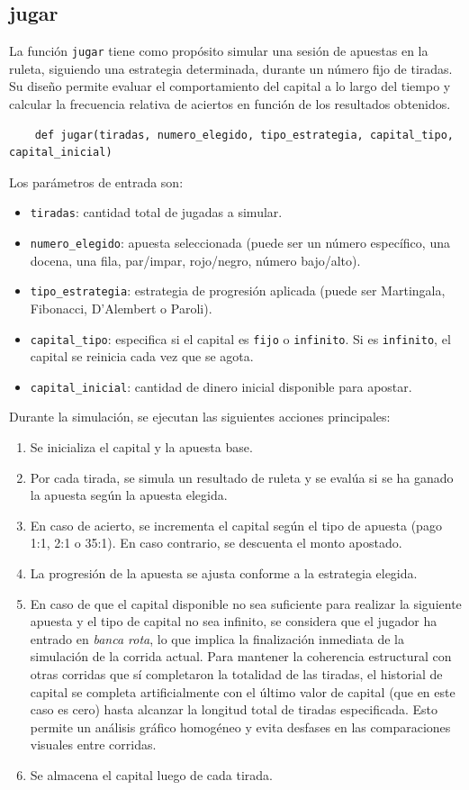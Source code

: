 \documentclass{article}
\begin{document}
\subsection{jugar}
La función \texttt{jugar} tiene como propósito simular una sesión de apuestas en la ruleta, siguiendo una estrategia determinada, durante un número fijo de tiradas. Su diseño permite evaluar el comportamiento del capital a lo largo del tiempo y calcular la frecuencia relativa de aciertos en función de los resultados obtenidos.

\begin{verbatim}
    def jugar(tiradas, numero_elegido, tipo_estrategia, capital_tipo, capital_inicial)
\end{verbatim}

\noindent Los parámetros de entrada son:
\begin{itemize}
    \item \texttt{tiradas}: cantidad total de jugadas a simular.
    \item \texttt{numero\_elegido}: apuesta seleccionada (puede ser un número específico, una docena, una fila, par/impar, rojo/negro, número bajo/alto).
    \item \texttt{tipo\_estrategia}: estrategia de progresión aplicada (puede ser Martingala, Fibonacci, D’Alembert o Paroli).
    \item \texttt{capital\_tipo}: especifica si el capital es \texttt{fijo} o \texttt{infinito}. Si es \texttt{infinito}, el capital se reinicia cada vez que se agota.
    \item \texttt{capital\_inicial}: cantidad de dinero inicial disponible para apostar.
\end{itemize}

Durante la simulación, se ejecutan las siguientes acciones principales:
\begin{enumerate}
    \item Se inicializa el capital y la apuesta base.
    \item Por cada tirada, se simula un resultado de ruleta y se evalúa si se ha ganado la apuesta según la apuesta elegida.
    \item En caso de acierto, se incrementa el capital según el tipo de apuesta (pago 1:1, 2:1 o 35:1). En caso contrario, se descuenta el monto apostado.
    \item La progresión de la apuesta se ajusta conforme a la estrategia elegida.
    \item En caso de que el capital disponible no sea suficiente para realizar la siguiente apuesta y el tipo de capital no sea infinito, se considera que el jugador ha entrado en \textit{banca rota}, lo que implica la finalización inmediata de la simulación de la corrida actual. Para mantener la coherencia estructural con otras corridas que sí completaron la totalidad de las tiradas, el historial de capital se completa artificialmente con el último valor de capital (que en este caso es cero) hasta alcanzar la longitud total de tiradas especificada. Esto permite un análisis gráfico homogéneo y evita desfases en las comparaciones visuales entre corridas.
    \item Se almacena el capital luego de cada tirada.
\end{enumerate}
\end{document}

